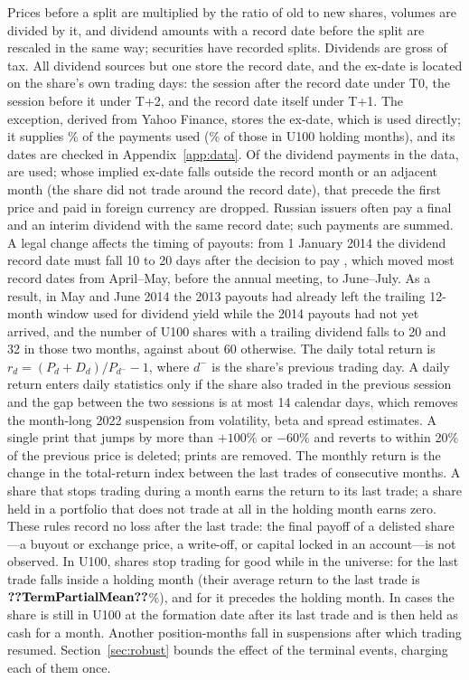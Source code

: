 \documentclass[11pt]{article}
\begin{document}
Prices before a split are multiplied by the ratio of old to new shares, volumes are divided by it, and dividend
amounts with a record date before the split are rescaled in the same way;  securities have recorded
splits. Dividends are gross of tax. All dividend sources but one store the record date, and the ex-date is located
on the share's own trading days: the session after the record date under T0, the session before it under T+2, and the
record date itself under T+1. The exception, derived from Yahoo Finance, stores the ex-date, which is used directly; it supplies \% of the payments used (\% of those in U100 holding
months), and its dates are checked in Appendix~\ref{app:data}. Of the dividend payments in the data,  are used;  whose
implied ex-date falls outside the record month or an adjacent month (the share did not trade around the record date),
 that precede the first price and  paid in foreign currency are dropped.
Russian issuers often pay a final and an interim dividend with the same record date; such payments are summed. A legal change affects the timing of payouts: from 1 January 2014 the dividend record date must
fall 10 to 20 days after the decision to pay \citep{law379}, which moved most record dates from April--May, before the
annual meeting, to June--July. As a result, in May and June 2014 the 2013 payouts had already left the trailing
12-month window used for dividend yield while the 2014 payouts had not yet arrived, and the number of U100 shares with a
trailing dividend falls to 20 and 32 in those two months, against about 60 otherwise. The daily total return is
$r_d=(P_d+D_d)/P_{d^-}-1$, where $d^-$ is the share's previous trading day. A daily return enters daily statistics only if the share also traded in the previous session and
the gap between the two sessions is at most 14 calendar days, which removes the month-long 2022 suspension from
volatility, beta and spread estimates. A single print that jumps by more than $+100\%$ or $-60\%$ and reverts to within
20\% of the previous price is deleted;  prints are removed. The monthly return is the change in the
total-return index between the last trades of consecutive months. A share that stops trading during a month earns the
return to its last trade; a share held in a portfolio that does not trade at all in the holding month earns zero.
These rules record no loss after the last trade: the final payoff of a delisted share---a buyout or exchange price, a
write-off, or capital locked in an account---is not observed. In U100,  shares stop trading for good
while in the universe: for  the last trade falls inside a holding month (their average return to
the last trade is $\val{TermPartialMean}$\%), and for  it precedes the holding month. In
 cases the share is still in U100 at the formation date after its last trade and is then held as cash
for a month.
Another  position-months fall in suspensions after which trading resumed. Section~\ref{sec:robust} bounds
the effect of the terminal events, charging each of them once.
\end{document}

